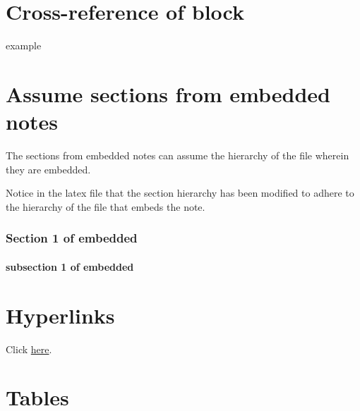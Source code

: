 \documentclass{extarticle}
\begin{document}
\section{\maltese Cross-reference of block}

example



\section{Assume sections from embedded notes}

The sections from embedded notes can assume the hierarchy of the file wherein they are embedded.

\begin{tcolorbox}[width=1.0\textwidth,colback={white},title={note},outer arc=0mm,colupper=black]

Notice in the latex file that the section hierarchy has been modified to adhere to the hierarchy of the file that embeds the note.

\end{tcolorbox}




\subsubsection{Section 1 of embedded}

\paragraph{subsection 1 of embedded}








\section{Hyperlinks}

Click \href{https://www.youtube.com/}{here}.





\section{Tables}
\end{document}
